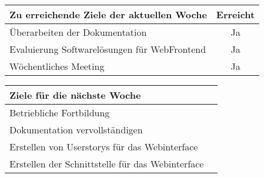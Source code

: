 \begin{tabularx}{\textwidth}{Xc}
    \arrayrulecolor{OliveGreen}
    \toprule
    {\bfseries Zu erreichende Ziele der aktuellen Woche} & {\bfseries Erreicht} \\
    \midrule[2pt]
    Überarbeiten der Dokumentation                        &Ja                \\
    \rowcolor{OliveGreen!15}
   Evaluierung Softwarelösungen für WebFrontend           &Ja                \\
    \rowcolor{White}
    Wöchentliches Meeting                                 &Ja                \\
   \bottomrule[2pt]
\end{tabularx}
%
\vspace{1cm}
%
\begin{tabularx}{\textwidth}{Xc}
    \arrayrulecolor{OliveGreen}
    \toprule
    {\bfseries Ziele für die nächste Woche}        &                         \\
    \midrule[2pt]
    Betriebliche Fortbildung                       &                         \\
    \rowcolor{OliveGreen!15}
    Dokumentation vervollständigen                 &                         \\
    \rowcolor{White}
    Erstellen von Userstorys für das Webinterface  &                         \\
    \rowcolor{OliveGreen!15}
    Erstellen der Schnittstelle für das Webinterface &                       \\
\end{tabularx}
